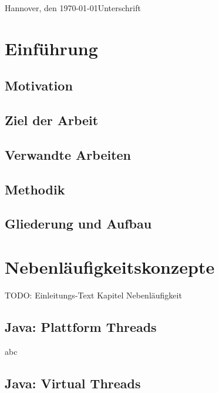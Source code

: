 \documentclass[fontsize=12pt,paper=a4,twoside=semi,parskip=half-,headsepline,headinclude]{scrreprt}
\begin{document}
Hannover, den \today \hfill Unterschrift


\newpage 
\thispagestyle{empty}
\quad 
\newpage


  \tableofcontents  %

\listoffigures      %

\listoftables       %

\chapter{Einführung}

\section{Motivation}

\section{Ziel der Arbeit}

\section{Verwandte Arbeiten}

\section{Methodik}

\section{Gliederung und Aufbau}



\chapter{Nebenläufigkeitskonzepte}

TODO: Einleitungs-Text Kapitel Nebenläufigkeit

\section{Java: Plattform Threads}

abc

\section{Java: Virtual Threads}
\end{document}
